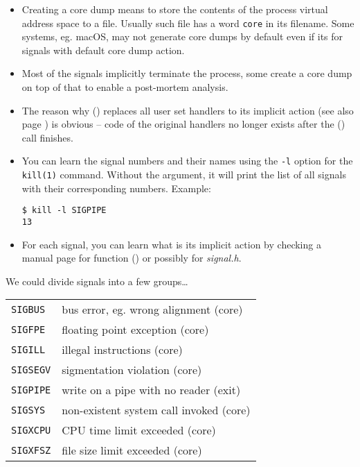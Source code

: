 \begin{itemize}
\item Creating a core dump means to store the contents of the process virtual
address space to a file.  Usually such file has a word \texttt{core} in its
filename.  Some systems, eg. macOS, may not generate core dumps by default even
if its for signals with default core dump action.
\item Most of the signals implicitly terminate the process, some create a core
dump on top of that to enable a post-mortem analysis.
\item The reason why () replaces all user set handlers to its
implicit action (see also page \pageref{EXEC}) is obvious -- code of the
original handlers no longer exists after the () call finishes.
\item You can learn the signal numbers and their names using the \texttt{-l}
option for the \texttt{kill(1)} command.  Without the argument, it will print
the list of all signals with their corresponding numbers.  Example:

\begin{verbatim}
$ kill -l SIGPIPE
13
\end{verbatim}
\item For each signal, you can learn what is its implicit action by checking a
manual page for function () or possibly for \emph{signal.h}.
\end{itemize}



\begin{slide}

We could divide signals into a few groups\dots


\begin{tabular}{ll}
\texttt{SIGBUS} & bus error, eg. wrong alignment (core) \\
\texttt{SIGFPE} & floating point exception (core) \\
\texttt{SIGILL} & illegal instructions (core) \\
\texttt{SIGSEGV} & sigmentation violation (core) \\
\texttt{SIGPIPE} & write on a pipe with no reader (exit) \\
\texttt{SIGSYS} & non-existent system call invoked (core) \\
\texttt{SIGXCPU} & CPU time limit exceeded (core) \\
\texttt{SIGXFSZ} & file size limit exceeded (core)\\
\end{tabular}
\end{slide}


